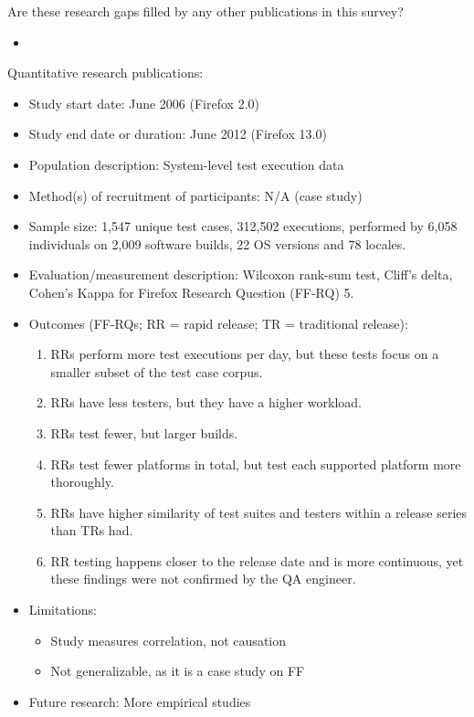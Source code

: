 \documentclass[]{book}
\providecommand{\tightlist}{%
  \setlength{\itemsep}{0pt}\setlength{\parskip}{0pt}}
\begin{document}
Are these research gaps filled by any other publications in this survey?

\begin{itemize}
\item
\end{itemize}

Quantitative research publications:

\begin{itemize}
\tightlist
\item
  Study start date: June 2006 (Firefox 2.0)
\item
  Study end date or duration: June 2012 (Firefox 13.0)
\item
  Population description: System-level test execution data
\item
  Method(s) of recruitment of participants: N/A (case study)
\item
  Sample size: 1,547 unique test cases, 312,502 executions, performed by
  6,058 individuals on 2,009 software builds, 22 OS versions and 78
  locales.
\item
  Evaluation/measurement description: Wilcoxon rank-sum test, Cliff's
  delta, Cohen's Kappa for Firefox Research Question (FF-RQ) 5.
\item
  Outcomes (FF-RQs; RR = rapid release; TR = traditional release):

  \begin{enumerate}
  \def\labelenumi{\arabic{enumi}.}
  \tightlist
  \item
    RRs perform more test executions per day, but these tests focus on a
    smaller subset of the test case corpus.
  \item
    RRs have less testers, but they have a higher workload.
  \item
    RRs test fewer, but larger builds.
  \item
    RRs test fewer platforms in total, but test each supported platform
    more thoroughly.
  \item
    RRs have higher similarity of test suites and testers within a
    release series than TRs had.
  \item
    RR testing happens closer to the release date and is more
    continuous, yet these findings were not confirmed by the QA
    engineer.
  \end{enumerate}
\item
  Limitations:

  \begin{itemize}
  \tightlist
  \item
    Study measures correlation, not causation
  \item
    Not generalizable, as it is a case study on FF
  \end{itemize}
\item
  Future research: More empirical studies
\end{itemize}
\end{document}
